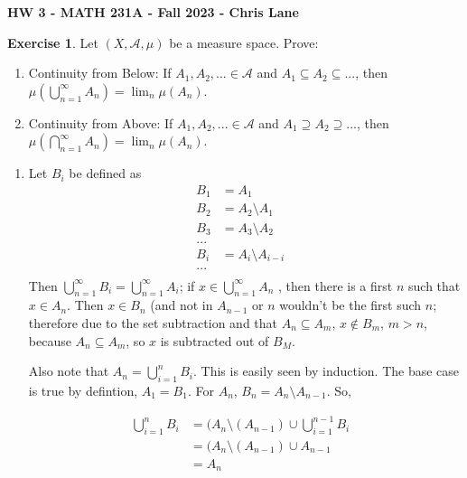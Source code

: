 \documentclass[11pt,oneside]{article}
\numberwithin{equation}{section}
\theoremstyle{definition}
\newtheorem{exercise}{Exercise}
\begin{document}
\textbf{HW 3 - MATH 231A - Fall 2023 - Chris Lane}

\begin{exercise}
  Let $(X, \mathcal{A}, \mu)$ be a measure space.  Prove:
  \begin{enumerate}
  \item
    Continuity from Below: If $A_1, A_2, ... \in \mathcal{A}$ and $A_1 \subseteq A_2 \subseteq ...$, then
    $\mu ( \bigcup \limits _{n=1} ^\infty A_n ) = \lim _n  \mu ( A_n)$.
  \item
    Continuity from Above: If $A_1, A_2, ... \in \mathcal{A}$ and $A_1 \supseteq A_2 \supseteq ...$, then
    $\mu ( \bigcap \limits _{n=1} ^\infty A_n ) = \lim _n \mu(A_n)$.
  \end{enumerate}
\end{exercise}
\begin{solution}
  \begin{enumerate}
  \item
    Let $B_i$ be defined as
    \begin{align*}
      B_1 &= A_1 & \\
      B_2 &= A_2 \setminus A_1 & \\
      B_3 &= A_3 \setminus A_2 & \\
      ...\\
      B_i & = A_i \setminus A_{i-i} & \\
      ...\\
    \end{align*}
    Then $\bigcup \limits _{n=1} ^ \infty B_i = \bigcup \limits _{n=1}
    ^ \infty A_i$; if $x \in \bigcup \limits _ {n=1} ^ \infty A_n$ ,
    then there is a first $n$ such that $x \in A_n$.  Then $x \in B_n$
    (and not in $A_{n-1}$ or $n$ wouldn't be the first such $n$;
    therefore due to the set subtraction and that $A_n \subseteq A_m$,
    $x \notin B_m$, $m > n$, because $A_n \subseteq A_m$, so $x$ is subtracted out of $B_M$.

    Also note that $A_n = \bigcup \limits _ {i = 1}^n B_i$.  This is
    easily seen by induction.  The base case is true by defintion,
    $A_1 = B_1$.  For $A_n$, $B_n = A_n \setminus A_{n-1}$.  So,

    \begin{align*} 
      \bigcup \limits _ {i=1}^n B_i &= ( A_n \setminus ( A_{n-1} ) \cup \bigcup \limits _ {i=1} ^ {n-1} B_i &\\
       &= ( A_n \setminus ( A_{n-1} ) \cup A_{n-1} & \\
       &= A_n \\
    \end{align*}


\end{enumerate}
\end{solution}
\end{document}
